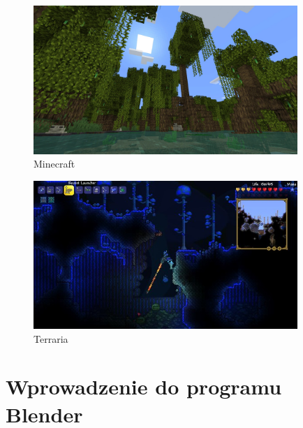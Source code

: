 \documentclass[12pt,twoside]{article}
\begin{document}
\begin{figure}[ht!]
	\centering
	\includegraphics[width=10cm]{GamePictures/Minecraft.jpg}
	\caption{Minecraft}
    \label{Pict:Minecraft}
\end{figure}



\begin{figure}[ht!]
	\centering
	\includegraphics[width=10cm]{GamePictures/terraria.jpg}
	\caption{Terraria}
    \label{Pict:Terraria}

\end{figure}



\clearpage	



\section{Wprowadzenie do programu Blender}
\end{document}
